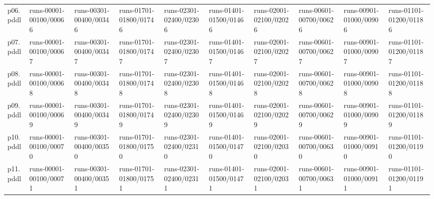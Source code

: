 \documentclass{article}
\begin{document}
\begin{tabular}{@{}lrrrrrrrrr@{}}
p06.pddl & \multicolumn{1}{|l|}{runs-00001-00100/00066} & \multicolumn{1}{|l|}{runs-00301-00400/00346} & \multicolumn{1}{|l|}{runs-01701-01800/01746} & \multicolumn{1}{|l|}{runs-02301-02400/02306} & \multicolumn{1}{|l|}{runs-01401-01500/01466} & \multicolumn{1}{|l|}{runs-02001-02100/02026} & \multicolumn{1}{|l|}{runs-00601-00700/00626} & \multicolumn{1}{|l|}{runs-00901-01000/00906} & \multicolumn{1}{|l|}{runs-01101-01200/01186} \\
p07.pddl & \multicolumn{1}{|l|}{runs-00001-00100/00067} & \multicolumn{1}{|l|}{runs-00301-00400/00347} & \multicolumn{1}{|l|}{runs-01701-01800/01747} & \multicolumn{1}{|l|}{runs-02301-02400/02307} & \multicolumn{1}{|l|}{runs-01401-01500/01467} & \multicolumn{1}{|l|}{runs-02001-02100/02027} & \multicolumn{1}{|l|}{runs-00601-00700/00627} & \multicolumn{1}{|l|}{runs-00901-01000/00907} & \multicolumn{1}{|l|}{runs-01101-01200/01187} \\
p08.pddl & \multicolumn{1}{|l|}{runs-00001-00100/00068} & \multicolumn{1}{|l|}{runs-00301-00400/00348} & \multicolumn{1}{|l|}{runs-01701-01800/01748} & \multicolumn{1}{|l|}{runs-02301-02400/02308} & \multicolumn{1}{|l|}{runs-01401-01500/01468} & \multicolumn{1}{|l|}{runs-02001-02100/02028} & \multicolumn{1}{|l|}{runs-00601-00700/00628} & \multicolumn{1}{|l|}{runs-00901-01000/00908} & \multicolumn{1}{|l|}{runs-01101-01200/01188} \\
p09.pddl & \multicolumn{1}{|l|}{runs-00001-00100/00069} & \multicolumn{1}{|l|}{runs-00301-00400/00349} & \multicolumn{1}{|l|}{runs-01701-01800/01749} & \multicolumn{1}{|l|}{runs-02301-02400/02309} & \multicolumn{1}{|l|}{runs-01401-01500/01469} & \multicolumn{1}{|l|}{runs-02001-02100/02029} & \multicolumn{1}{|l|}{runs-00601-00700/00629} & \multicolumn{1}{|l|}{runs-00901-01000/00909} & \multicolumn{1}{|l|}{runs-01101-01200/01189} \\
p10.pddl & \multicolumn{1}{|l|}{runs-00001-00100/00070} & \multicolumn{1}{|l|}{runs-00301-00400/00350} & \multicolumn{1}{|l|}{runs-01701-01800/01750} & \multicolumn{1}{|l|}{runs-02301-02400/02310} & \multicolumn{1}{|l|}{runs-01401-01500/01470} & \multicolumn{1}{|l|}{runs-02001-02100/02030} & \multicolumn{1}{|l|}{runs-00601-00700/00630} & \multicolumn{1}{|l|}{runs-00901-01000/00910} & \multicolumn{1}{|l|}{runs-01101-01200/01190} \\
p11.pddl & \multicolumn{1}{|l|}{runs-00001-00100/00071} & \multicolumn{1}{|l|}{runs-00301-00400/00351} & \multicolumn{1}{|l|}{runs-01701-01800/01751} & \multicolumn{1}{|l|}{runs-02301-02400/02311} & \multicolumn{1}{|l|}{runs-01401-01500/01471} & \multicolumn{1}{|l|}{runs-02001-02100/02031} & \multicolumn{1}{|l|}{runs-00601-00700/00631} & \multicolumn{1}{|l|}{runs-00901-01000/00911} & \multicolumn{1}{|l|}{runs-01101-01200/01191} \\

\end{tabular}
\end{document}
